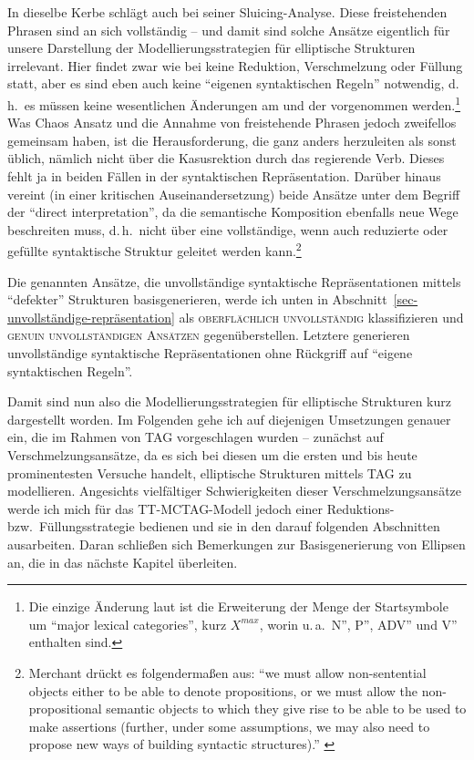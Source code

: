 In dieselbe Kerbe schlägt auch \citet[233ff]{Riemsdijk:78} bei seiner Sluicing-Analyse. Diese freistehenden Phrasen sind an sich vollständig -- und damit sind solche Ansätze eigentlich für unsere Darstellung der Modellierungsstrategien für elliptische Strukturen irrelevant. Hier findet zwar wie bei \cite{Chao:87} keine Reduktion, Verschmelzung oder Füllung statt, aber es sind eben auch keine "`eigenen syntaktischen Regeln"' notwendig, d.\,h.\ es müssen keine wesentlichen Änderungen am  und der  vorgenommen werden.\footnote{Die einzige Änderung laut \citet[53ff]{Barton:90} ist die Erweiterung der Menge der Startsymbole um "`major lexical categories"', kurz $X^{max}$, worin u.\,a.\ N'', P'', ADV'' und V'' enthalten sind.} Was Chaos Ansatz und die Annahme von freistehende Phrasen jedoch zweifellos gemeinsam haben, ist die Herausforderung, die  ganz anders herzuleiten als sonst üblich, nämlich nicht über die Kasusrektion durch das regierende Verb. Dieses fehlt ja in beiden Fällen in der syntaktischen Repräsentation. Darüber hinaus vereint \cite{Merchant:04} (in einer kritischen Auseinandersetzung) beide Ansätze unter dem Begriff der "`direct interpretation"', da die semantische Komposition ebenfalls neue Wege beschreiten muss, d.\,h.\ nicht über eine vollständige, wenn auch reduzierte oder gefüllte syntaktische Struktur geleitet werden kann.\footnote{Merchant drückt es folgenderma\ss en aus: "`we must allow non-sentential objects either to be able to denote propositions, or we must allow the non-propositional semantic objects to which they give rise to be able to be used to make assertions (further, under some assumptions, we may also need to propose new ways of building syntactic structures)."' \citep[662]{Merchant:04}} 

Die genannten Ansätze, die unvollständige syntaktische Repräsentationen mittels "`defekter"' Strukturen basisgenerieren, werde ich unten in Abschnitt~\ref{sec-unvollständige-repräsentation} als \textsc{oberflächlich unvollständig} klassifizieren und \textsc{genuin unvollständigen Ansätzen} gegenüberstellen. Letztere generieren unvollständige syntaktische Repräsentationen ohne Rückgriff auf "`eigene syntaktischen Regeln"'. %


Damit sind nun also die Modellierungsstrategien für elliptische Strukturen kurz dargestellt worden. Im Folgenden gehe ich auf diejenigen Umsetzungen genauer ein, die im Rahmen von TAG vorgeschlagen wurden -- zunächst auf Verschmelzungsansätze, da es sich bei diesen um die ersten und bis heute prominentesten Versuche handelt, elliptische Strukturen mittels TAG zu modellieren. Angesichts vielfältiger Schwierigkeiten dieser Verschmelzungsansätze werde ich mich für das TT-MCTAG-Modell jedoch einer Reduktions- bzw.\ Füllungsstrategie bedienen und sie in den darauf folgenden Abschnitten ausarbeiten. Daran schlie\ss en sich Bemerkungen zur Basisgenerierung von Ellipsen an, die in das nächste Kapitel überleiten.    


